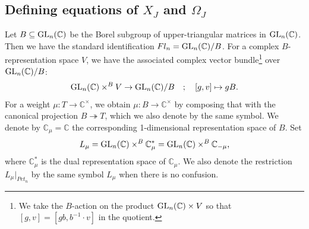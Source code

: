 \subsection{Defining equations of \texorpdfstring{$X_J$}{XJ} and \texorpdfstring{$\Omega_J$}{OmegaJ}}\label{subsec: equation of X and Omega}
Let $B\subseteq {\rm GL}_n({\mathbb C})$ be the Borel subgroup of upper-triangular matrices in ${\rm GL}_n({\mathbb C})$. Then we have the standard identification $Fl_n={\rm GL}_n({\mathbb C})/B$. For a complex $B$-representation space $V$, we have the associated complex vector bundle\footnote{We take the $B$-action on the product ${\rm GL}_n({\mathbb C})\times V$ so that $[g,v]=[gb,b^{-1}\cdot v]$ in the quotient.} over ${\rm GL}_n({\mathbb C})/B$:
\begin{align*}
{\rm GL}_n({\mathbb C})\times^B V \rightarrow {\rm GL}_n({\mathbb C})/B
\quad ; \quad
[g,v]\mapsto gB.
\end{align*}
For a weight $\mu\colon T\rightarrow {\mathbb C}^{\times}$, we obtain $\mu\colon B\rightarrow {\mathbb C}^{\times}$ by composing that with the canonical projection $B\twoheadrightarrow T$, which we also denote by the same symbol. We denote by ${\mathbb C}_{\mu}={\mathbb C}$ the corresponding 1-dimensional representation space of $B$. Set
\begin{align}\label{eq: def of Lmu 2}
L_{\mu} = {\rm GL}_n({\mathbb C})\times^B {\mathbb C}_{\mu}^* = {\rm GL}_n({\mathbb C})\times^B {\mathbb C}_{-\mu},
\end{align}
where ${\mathbb C}_{\mu}^*$ is the dual representation space of ${\mathbb C}_{\mu}$. We also denote the restriction $L_{\mu}|_{Pet_{n}}$ by the same symbol $L_{\mu}$ when there is no confusion.

